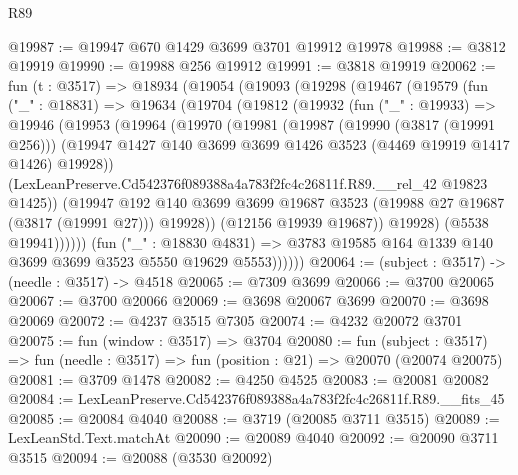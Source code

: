 \begin{lexlean}{R89}
\begin{coremodule}
@19987 := @19947 @670 @1429 @3699 @3701 @19912 @19978
@19988 := @3812 @19919
@19990 := @19988 @256 @19912
@19991 := @3818 @19919
@20062 := fun (t : @3517) =>
  @18934
    (@19054
      (@19093
        (@19298
          (@19467
            (@19579
              (fun ("_" : @18831) =>
              @19634
                (@19704
                  (@19812
                    (@19932
                      (fun ("_" : @19933) =>
                      @19946
                        (@19953
                          (@19964
                            (@19970
                              (@19981
                                (@19987
                                  (@19990 (@3817 (@19991 @256)))
                                  (@19947
                                    @1427
                                    @140
                                    @3699
                                    @3699
                                    @1426
                                    @3523
                                    (@4469 @19919 @1417 @1426)
                                    @19928))
                                (LexLeanPreserve.Cd542376f089388a4a783f2fc4c26811f.R89.__rel_42
                                  @19823
                                  @1425))
                              (@19947
                                @192
                                @140
                                @3699
                                @3699
                                @19687
                                @3523
                                (@19988 @27 @19687 (@3817 (@19991 @27)))
                                @19928))
                            (@12156 @19939 @19687))
                          @19928)
                        (@5538 @19941))))))
              (fun ("_" : @18830 @4831) =>
              @3783 @19585 @164 @1339 @140 @3699 @3699 @3523 @5550 @19629 @5553))))))
@20064 := (subject : @3517) -> (needle : @3517) -> @4518
@20065 := @7309 @3699
@20066 := @3700 @20065
@20067 := @3700 @20066
@20069 := @3698 @20067 @3699
@20070 := @3698 @20069
@20072 := @4237 @3515 @7305
@20074 := @4232 @20072 @3701
@20075 := fun (window : @3517) => @3704
@20080 := fun (subject : @3517) =>
  fun (needle : @3517) => fun (position : @21) => @20070 (@20074 @20075)
@20081 := @3709 @1478
@20082 := @4250 @4525
@20083 := @20081 @20082
@20084 := LexLeanPreserve.Cd542376f089388a4a783f2fc4c26811f.R89.__fits_45
@20085 := @20084 @4040
@20088 := @3719 (@20085 @3711 @3515)
@20089 := LexLeanStd.Text.matchAt
@20090 := @20089 @4040
@20092 := @20090 @3711 @3515
@20094 := @20088 (@3530 @20092)

\end{coremodule}
\end{lexlean}
